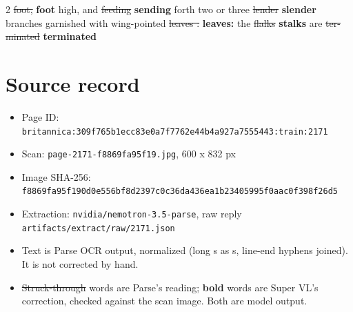 \documentclass[10pt]{article}
\begin{document}
\begin{multicols}{2}
\sout{foot,} \textbf{foot} high, and \sout{feeding} \textbf{sending} forth two or three \sout{lender} \textbf{slender} branches garnished with wing-pointed \sout{leaves :} \textbf{leaves:} the \sout{flalks} \textbf{stalks} are \sout{ter-minated} \textbf{terminated}
\end{multicols}
\section*{Source record}
\begin{itemize}
\item Page ID: \texttt{britannica:309f765b1ecc83e0a7f7762e44b4a927a7555443:train:2171}
\item Scan: \texttt{page-2171-f8869fa95f19.jpg}, 600 x 832 px
\item Image SHA-256: \texttt{\small f8869fa95f190d0e556bf8d2397c0c36da436ea1b23405995f0aac0f398f26d5}
\item Extraction: \texttt{nvidia/nemotron-3.5-parse}, raw reply \texttt{artifacts/extract/raw/2171.json}
\item Text is Parse OCR output, normalized (long s as s, line-end hyphens joined). It is not corrected by hand.
\item \sout{Struck-through} words are Parse's reading; \textbf{bold} words are Super VL's correction, checked against the scan image. Both are model output.
\end{itemize}
\end{document}
